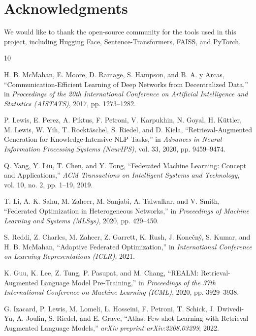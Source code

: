 \documentclass[acmsmall,screen]{acmart}
\begin{document}
\section*{Acknowledgments}

We would like to thank the open-source community for the tools used in this project, including Hugging Face, Sentence-Transformers, FAISS, and PyTorch.

\begin{thebibliography}{10}

H. B. McMahan, E. Moore, D. Ramage, S. Hampson, and B. A. y Arcas,
``Communication-Efficient Learning of Deep Networks from Decentralized Data,''
in \textit{Proceedings of the 20th International Conference on Artificial Intelligence and Statistics (AISTATS)}, 2017, pp. 1273--1282.

P. Lewis, E. Perez, A. Piktus, F. Petroni, V. Karpukhin, N. Goyal, H. Küttler, M. Lewis, W. Yih, T. Rocktäschel, S. Riedel, and D. Kiela,
``Retrieval-Augmented Generation for Knowledge-Intensive NLP Tasks,''
in \textit{Advances in Neural Information Processing Systems (NeurIPS)}, vol. 33, 2020, pp. 9459--9474.

Q. Yang, Y. Liu, T. Chen, and Y. Tong,
``Federated Machine Learning: Concept and Applications,''
\textit{ACM Transactions on Intelligent Systems and Technology}, vol. 10, no. 2, pp. 1--19, 2019.

T. Li, A. K. Sahu, M. Zaheer, M. Sanjabi, A. Talwalkar, and V. Smith,
``Federated Optimization in Heterogeneous Networks,''
in \textit{Proceedings of Machine Learning and Systems (MLSys)}, 2020, pp. 429--450.

S. Reddi, Z. Charles, M. Zaheer, Z. Garrett, K. Rush, J. Konečný, S. Kumar, and H. B. McMahan,
``Adaptive Federated Optimization,''
in \textit{International Conference on Learning Representations (ICLR)}, 2021.

K. Guu, K. Lee, Z. Tung, P. Pasupat, and M. Chang,
``REALM: Retrieval-Augmented Language Model Pre-Training,''
in \textit{Proceedings of the 37th International Conference on Machine Learning (ICML)}, 2020, pp. 3929--3938.

G. Izacard, P. Lewis, M. Lomeli, L. Hosseini, F. Petroni, T. Schick, J. Dwivedi-Yu, A. Joulin, S. Riedel, and E. Grave,
``Atlas: Few-shot Learning with Retrieval Augmented Language Models,''
\textit{arXiv preprint arXiv:2208.03299}, 2022.


\end{thebibliography}
\end{document}
